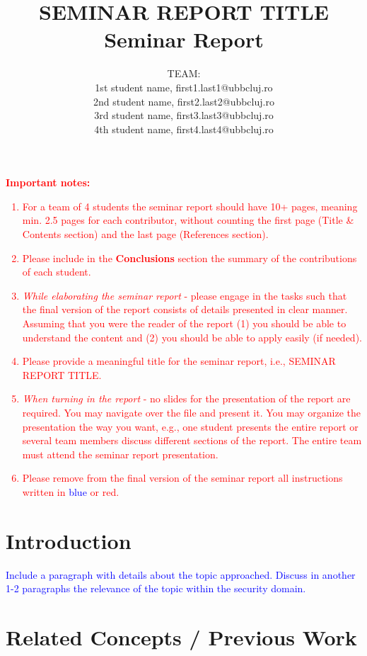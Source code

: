\documentclass{article}
\title{\textbf{SEMINAR REPORT TITLE}\\
Seminar Report}
\author{TEAM:\\
1st student name, first1.last1@ubbcluj.ro\\
2nd student name, first2.last2@ubbcluj.ro\\
3rd student name, first3.last3@ubbcluj.ro\\
4th student name, first4.last4@ubbcluj.ro
}
\begin{document}
\maketitle

\textcolor{red}{\textbf{Important notes:}
\begin{enumerate}
    \item For a team of 4 students the seminar report should have 10+ pages, meaning min. 2.5 pages for each contributor, without counting the first page (Title \& Contents section) and the last page (References section).
    \item Please include in the \textbf{Conclusions} section the summary of the contributions of each student.
    \item \textit{While elaborating the seminar report} - please engage in the tasks such that the final version of the report consists of details presented in clear manner. Assuming that you were the reader of the report (1) you should be able to understand the content and (2) you should be able to apply easily (if needed).
    \item Please provide a meaningful title for the seminar report, i.e., SEMINAR REPORT TITLE.
    \item \textit{When turning in the report} - no slides for the presentation of the report are required. You may navigate over the file and present it. You may organize the presentation the way you want, e.g., one student presents the entire report or several team members discuss different sections of the report. The entire team must attend the seminar report presentation.
    \item Please remove from the final version of the seminar report all instructions written in \textcolor{blue}{blue} or \textcolor{red}{red}.
\end{enumerate}
}

\tableofcontents

\newpage

\section{Introduction}
\label{label:Introduction}

\textcolor{blue}{Include a paragraph with details about the topic approached. Discuss in another 1-2 paragraphs the relevance of the topic within the security domain.
}


\section{Related Concepts / Previous Work}
\label{label:RelatedConcepts}
\end{document}
